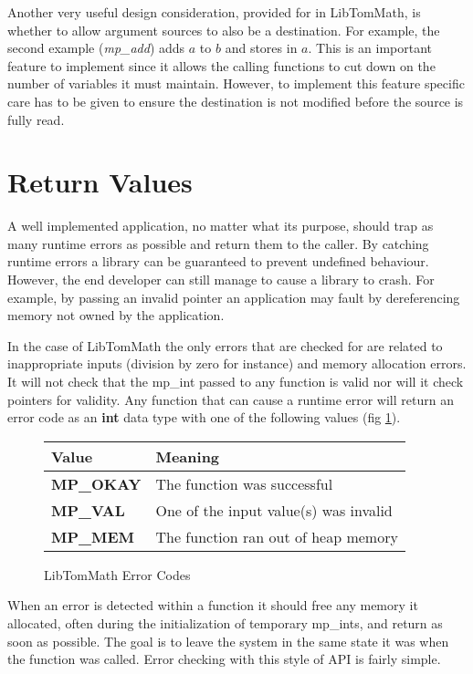 \documentclass[b5paper]{book}
\begin{document}
Another very useful design consideration, provided for in LibTomMath, is whether to allow argument sources to also be a 
destination.  For example, the second example (\textit{mp\_add}) adds $a$ to $b$ and stores in $a$.  This is an important 
feature to implement since it allows the calling functions to cut down on the number of variables it must maintain.  
However, to implement this feature specific care has to be given to ensure the destination is not modified before the 
source is fully read.

\section{Return Values}
A well implemented application, no matter what its purpose, should trap as many runtime errors as possible and return them 
to the caller.  By catching runtime errors a library can be guaranteed to prevent undefined behaviour.  However, the end 
developer can still manage to cause a library to crash.  For example, by passing an invalid pointer an application may
fault by dereferencing memory not owned by the application.

In the case of LibTomMath the only errors that are checked for are related to inappropriate inputs (division by zero for 
instance) and memory allocation errors.  It will not check that the mp\_int passed to any function is valid nor 
will it check pointers for validity.  Any function that can cause a runtime error will return an error code as an 
\textbf{int} data type with one of the following values (fig \ref{fig:errcodes}).

  
\begin{figure}[here]
\begin{center}
\begin{tabular}{|l|l|}
\hline \textbf{Value} & \textbf{Meaning} \\
\hline \textbf{MP\_OKAY} & The function was successful \\
\hline \textbf{MP\_VAL}  & One of the input value(s) was invalid \\
\hline \textbf{MP\_MEM}  & The function ran out of heap memory \\
\hline
\end{tabular}
\end{center}
\caption{LibTomMath Error Codes}
\label{fig:errcodes}
\end{figure}

When an error is detected within a function it should free any memory it allocated, often during the initialization of
temporary mp\_ints, and return as soon as possible.  The goal is to leave the system in the same state it was when the 
function was called.  Error checking with this style of API is fairly simple.
\end{document}
